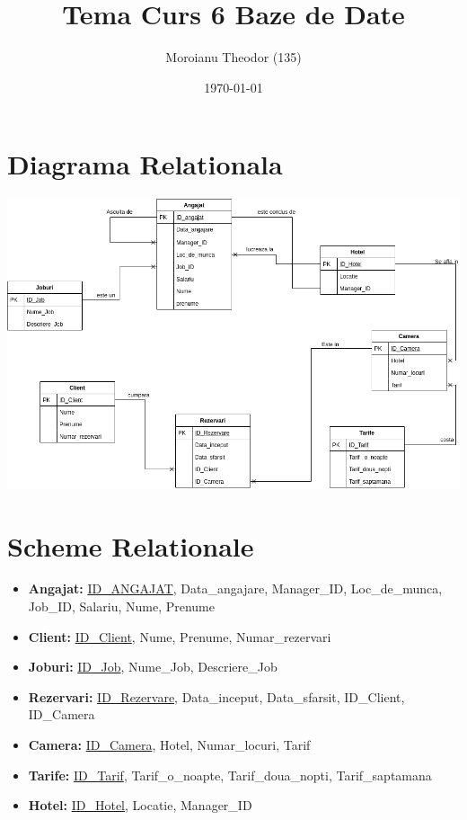 \documentclass[a4paper,12pt]{article}
\begin{document}
	
	\title{Tema Curs 6 Baze de Date}
	\author{Moroianu Theodor (135)}
	\date{\today}
	\maketitle

	\section{Diagrama Relationala\newline}
	
		\includegraphics[scale=0.52]{diagrama_tema_6_curs.png}
		
		\newpage
	
	\section{Scheme Relationale}
	
		\begin{itemize}
			\item \textbf{Angajat:} \underline{ID\_ANGAJAT}, Data\_angajare, Manager\_ID, Loc\_de\_munca, Job\_ID, Salariu, Nume, Prenume 
			\item \textbf{Client:} \underline{ID\_Client}, Nume, Prenume, Numar\_rezervari
			\item \textbf{Joburi:} \underline{ID\_Job}, Nume\_Job, Descriere\_Job
			\item \textbf{Rezervari:} \underline{ID\_Rezervare}, Data\_inceput, Data\_sfarsit, ID\_Client, ID\_Camera
			\item \textbf{Camera:} \underline{ID\_Camera}, Hotel, Numar\_locuri, Tarif
			\item \textbf{Tarife:} \underline{ID\_Tarif}, Tarif\_o\_noapte, Tarif\_doua\_nopti, Tarif\_saptamana
			\item \textbf{Hotel:} \underline{ID\_Hotel}, Locatie, Manager\_ID
		\end{itemize}
	
\end{document}
